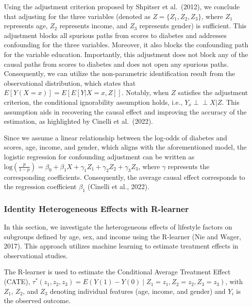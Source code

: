 \documentclass[
  12pt,
]{article}
\begin{document}
Using the adjustment criterion proposed by Shpitser et al.~(2012), we
conclude that adjusting for the three variables (denoted as
\(Z=\{Z_1, Z_2, Z_3\}\), where \(Z_1\) represents age, \(Z_2\)
represents income, and \(Z_3\) represents gender) is sufficient. This
adjustment blocks all spurious paths from scores to diabetes and
addresses confounding for the three variables. Moreover, it also blocks
the confounding path for the variable education. Importantly, this
adjustment does not block any of the causal paths from scores to
diabetes and does not open any spurious paths. Consequently, we can
utilize the non-parametric identification result from the observational
distribution, which states that \(E[Y(X=x)] = E[E[Y|X=x,Z]]\). Notably,
when \(Z\) satisfies the adjustment criterion, the conditional
ignorability assumption holds, i.e., \(Y_x \perp\!\!\!\perp X |Z\). This
assumption aids in recovering the causal effect and improving the
accuracy of the estimation, as highlighted by Cinelli et al.~(2022).

Since we assume a linear relationship between the log-odds of diabetes
and scores, age, income, and gender, which aligns with the
aforementioned model, the logistic regression for confounding adjustment
can be written as
\(\text{log}(\frac{p}{1-p}) = \beta_0 + \beta_1 X + \gamma_1 Z_1 + \gamma_2 Z_2 + \gamma_3 Z_3\),
where \(\gamma\) represents the corresponding coefficients.
Consequently, the average causal effect corresponds to the regression
coefficient \(\beta_1\) (Cinelli et al., 2022).

\hypertarget{identity-heterogeneous-effects-with-r-learner}{%
\subsubsection{Identity Heterogeneous Effects with
R-learner}\label{identity-heterogeneous-effects-with-r-learner}}

In this section, we investigate the heterogeneous effects of lifestyle
factors on subgroups defined by age, sex, and income using the R-learner
(Nie and Wager, 2017). This approach utilizes machine learning to
estimate treatment effects in observational studies.

The R-learner is used to estimate the Conditional Average Treatment
Effect (CATE),
\(\tau^*(z_1,z_2,z_3) = E(Y(1)-Y(0) \mid Z_1=z_1,Z_2 = z_2,Z_3 = z_3)\),
with \(Z_1\), \(Z_2\), and \(Z_3\) denoting individual features (age,
income, and gender) and \(Y_i\) is the observed outcome.
\end{document}
